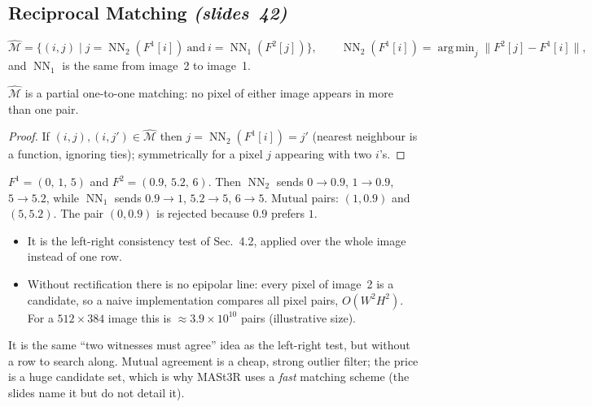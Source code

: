 \documentclass[11pt,a4paper]{article}
\newcommand{\slr}[1]{\texorpdfstring{\emph{(slides~#1)}}{(slides #1)}}
\DeclareMathOperator*{\argmin}{arg\,min}
\DeclareMathOperator{\NN}{NN}
\theoremstyle{definition}
\begin{document}
\subsection{Reciprocal Matching \slr{42}}
\begin{Definition}
\[ \hat{\mathcal M}=\bigl\{(i,j)\mid j=\NN_2(F^1[i])\ \text{and}\ i=\NN_1(F^2[j])\bigr\},\qquad \NN_2(F^1[i])=\argmin_j\lVert F^2[j]-F^1[i]\rVert, \]
and $\NN_1$ is the same from image~2 to image~1.
\end{Definition}
\begin{Lemma}
$\hat{\mathcal M}$ is a partial one-to-one matching: no pixel of either image appears in more than one pair.
\end{Lemma}
\begin{proof}
If $(i,j),(i,j')\in\hat{\mathcal M}$ then $j=\NN_2(F^1[i])=j'$ (nearest neighbour is a function, ignoring ties); symmetrically for a pixel $j$ appearing with two $i$'s.
\end{proof}
\begin{Example}
$F^1=(0,\,1,\,5)$ and $F^2=(0.9,\,5.2,\,6)$. Then $\NN_2$ sends $0\to0.9$, $1\to0.9$, $5\to5.2$, while $\NN_1$ sends $0.9\to1$, $5.2\to5$, $6\to5$. Mutual pairs: $(1,0.9)$ and $(5,5.2)$. The pair $(0,0.9)$ is rejected because $0.9$ prefers $1$.
\end{Example}
\begin{itemize}
\item It is the left-right consistency test of Sec.~4.2, applied over the whole image instead of one row.
\item Without rectification there is no epipolar line: every pixel of image~2 is a candidate, so a naive implementation compares all pixel pairs, $O(W^2H^2)$. For a $512\times384$ image this is $\approx3.9\times10^{10}$ pairs (illustrative size).
\end{itemize}
\begin{intuition}
It is the same ``two witnesses must agree'' idea as the left-right test, but without a row to search along. Mutual agreement is a cheap, strong outlier filter; the price is a huge candidate set, which is why MASt3R uses a \emph{fast} matching scheme (the slides name it but do not detail it).
\end{intuition}
\end{document}

